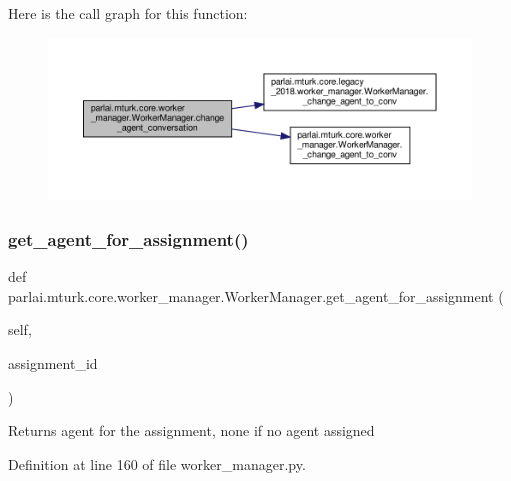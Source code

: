 Here is the call graph for this function\+:
\nopagebreak
\begin{figure}[H]
\begin{center}
\leavevmode
\includegraphics[width=350pt]{classparlai_1_1mturk_1_1core_1_1worker__manager_1_1WorkerManager_aa140d322d7237605580f5162a437e0ba_cgraph}
\end{center}
\end{figure}
\mbox{\label{classparlai_1_1mturk_1_1core_1_1worker__manager_1_1WorkerManager_aa60e04ed5327e2b3dc9f886a17352e72}} 
\subsubsection{\texorpdfstring{get\+\_\+agent\+\_\+for\+\_\+assignment()}{get\_agent\_for\_assignment()}}
{\footnotesize\ttfamily def parlai.\+mturk.\+core.\+worker\+\_\+manager.\+Worker\+Manager.\+get\+\_\+agent\+\_\+for\+\_\+assignment (\begin{DoxyParamCaption}\item[{}]{self,  }\item[{}]{assignment\+\_\+id }\end{DoxyParamCaption})}

\begin{DoxyVerb}Returns agent for the assignment, none if no agent assigned\end{DoxyVerb}
 

Definition at line 160 of file worker\+\_\+manager.\+py.



